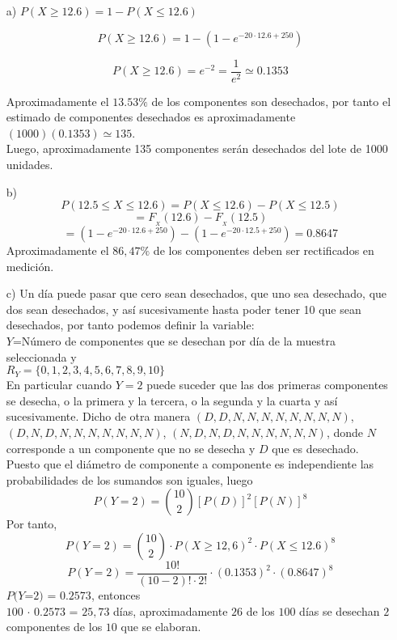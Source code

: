 \documentclass[base=hide,12pt]{elegantbook}
\begin{document}
\vspace{1cm}	
\begin{itemize}
\item[a)] $P(X \geq 12.6)= 1 - P(X \leq 12.6)$
			
	$$P(X \geq 12.6) = 1 - (1 - e^{-20 \cdot 12.6 + 250})$$
			
	$$P(X \geq 12.6) =  e^{-2} = \frac{1}{e^{2}} \simeq 0.1353$$
	

Aproximadamente el $13.53\%$ de los componentes son desechados, por tanto el estimado  de componentes desechados es aproximadamente $(1000)(0.1353) \simeq 135$.\\
	Luego, aproximadamente 135 componentes serán desechados del lote de 1000 unidades.
	
	\vspace{1cm} 
	\item[b)]
	$$P(12.5 \leq X \leq 12.6)=P(X \leq 12.6) - P(X \leq 12.5)$$
	$$= F_{_X}(12.6) - F_{_X}(12.5)$$
	$$=(1 - e^{-20 \cdot 12.6 + 250}) - (1 - e^{-20 \cdot 12.5 + 250})=0.8647$$
	Aproximadamente el $86,47\%$ de los componentes deben ser rectificados en medición.
	\vspace{1cm} 
	\item[c)] Un día puede pasar que cero sean desechados, que uno sea desechado, que dos sean desechados, y así sucesivamente hasta poder tener 10 que sean desechados, por tanto podemos definir la variable: \\
	
	$Y$=Número de componentes que se desechan por día de la muestra seleccionada  y\\
	$R_{Y}=\{ 0, 1, 2, 3, 4, 5, 6, 7, 8, 9, 10 \}$ \\
	
	
	En particular cuando $Y=2$ puede suceder que las dos primeras componentes se desecha, o la primera y la tercera, o la segunda y la cuarta y así sucesivamente. Dicho de otra manera $(D,D,N,N,N,N,N,N,N,N)$, $(D,N,D,N,N,N,N,N,N,N)$, $(N,D,N,D,N,N,N,N,N,N)$, donde $N$ corresponde  a un componente que no se desecha y $D$ que es desechado.\\
	Puesto que el diámetro de componente a componente es independiente las probabilidades de los sumandos son iguales, luego
	$$P(Y=2)= \displaystyle\binom{10}{2}[P(D)]^{2}[P(N)]^{8}$$
	Por tanto,
	$$P(Y=2) = \displaystyle\binom{10}{2} \cdot P(X \geq 12,6)^{2} \cdot P(X \leq 12.6)^{8}$$
	\[P(Y=2) = \displaystyle\dfrac{10!}{(10-2)! \cdot 2!} \cdot (0.1353)^{2} \cdot (0.8647)^{8}\]
	$P(Y$=$2)$ = $0.2573$, entonces\\
	$100$ $\cdot$ $0.2573$ = $25,73$ días, aproximadamente $26$ de los $100$ días se desechan $2$ componentes de los $10$ que se elaboran.\\
\end{itemize}
	
\end{document}
